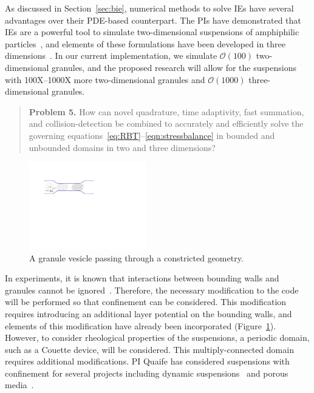 As discussed in Section~\ref{sec:bie},
numerical methods to solve IEs have several advantages over their
PDE-based counterpart. The PIs have demonstrated that IEs are a powerful
tool to simulate two-dimensional suspensions of amphiphilic
particles~\cite{Fu2018_SIAM, FuQuRyYo22, fu-ryh-qua-you2022}, and
elements of these formulations have been developed in three
dimensions~\cite{ying_2006, manasthesis, rac-gre2016}. In our current
implementation, we simulate $\mathcal{O}(100)$ two-dimensional granules,
and the proposed research will allow for the suspensions with
100X--1000X more two-dimensional granules and $\mathcal{O}(1000)$
three-dimensional granules. 

\begin{quotation}
  \noindent
  \textbf{Problem 5.} How can novel quadrature, time adaptivity, fast
  summation, and collision-detection be combined to accurately and
  efficiently solve the governing
  equations~\eqref{eq:RBT}--\eqref{eqn:stressbalance} in bounded and
  unbounded domains in two and three dimensions?
\end{quotation}

\begin{figure}
  \centering
  \includegraphics[width=2in]{figures/SA2Figures/confinement.pdf}
  \caption{\label{fig:stenosis} \footnotesize A granule vesicle passing
  through a constricted geometry.}
\end{figure}

In experiments, it is known that interactions between bounding walls and
granules cannot be ignored~\cite{qua-gan-you2021,
KaouiHartingMisbah2011_PRE, her-sto-gra2005}. Therefore, the necessary
modification to the code will be performed so that confinement can be
considered. This modification requires introducing an additional layer
potential on the bounding walls, and elements of this modification have
already been incorporated (Figure~\ref{fig:stenosis}). However, to
consider rheological properties of the suspensions, a periodic domain,
such as a Couette device, will be considered. This multiply-connected
domain requires additional modifications. PI Quaife has considered
suspensions with confinement for several projects including dynamic
suspensions~\cite{qua-bir2014, bys-sha-qua2020} and porous
media~\cite{chi-moo-qua2020, dea-qua-bir-jua2018, moo-che-chi-qua2022,
qua-gan-you2021}. 


